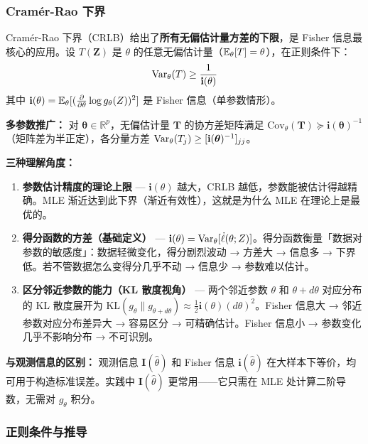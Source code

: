 \subsubsection{Cramér-Rao 下界}

Cramér-Rao 下界（CRLB）给出了\textbf{所有无偏估计量方差的下限}，是 Fisher 信息最核心的应用。设 $T(\mathbf{Z})$ 是 $\theta$ 的任意无偏估计量（$\mathbb{E}_\theta[T] = \theta$），在正则条件下：
\begin{equation}\label{eq:CRLB}
    \mathrm{Var}_\theta(T) \geq \frac{1}{\mathbf{i}(\theta)}
\end{equation}
其中 $\mathbf{i}(\theta) = \mathbb{E}_\theta[(\frac{\partial}{\partial\theta}\log g_\theta(Z))^2]$ 是 Fisher 信息（单参数情形）。

\textbf{多参数推广：} 对 $\bm{\theta} \in \mathbb{R}^p$，无偏估计量 $\mathbf{T}$ 的协方差矩阵满足 $\mathrm{Cov}_\theta(\mathbf{T}) \succeq \mathbf{i}(\bm{\theta})^{-1}$（矩阵差为半正定），各分量方差 $\mathrm{Var}_\theta(T_j) \geq [\mathbf{i}(\bm{\theta})^{-1}]_{jj}$。

\textbf{三种理解角度：}
\begin{enumerate}
    \item \textbf{参数估计精度的理论上限} — $\mathbf{i}(\theta)$ 越大，CRLB 越低，参数能被估计得越精确。MLE 渐近达到此下界（渐近有效性），这就是为什么 MLE 在理论上是最优的。
    \item \textbf{得分函数的方差（基础定义）} — $\mathbf{i}(\theta) = \mathrm{Var}_\theta[\dot{\ell}(\theta; Z)]$。得分函数衡量「数据对参数的敏感度」：数据轻微变化，得分剧烈波动 → 方差大 → 信息多 → 下界低。若不管数据怎么变得分几乎不动 → 信息少 → 参数难以估计。
    \item \textbf{区分邻近参数的能力（KL 散度视角）} — 两个邻近参数 $\theta$ 和 $\theta+d\theta$ 对应分布的 KL 散度展开为 $\mathrm{KL}(g_\theta \parallel g_{\theta+d\theta}) \approx \frac{1}{2}\mathbf{i}(\theta)(d\theta)^2$。Fisher 信息大 → 邻近参数对应分布差异大 → 容易区分 → 可精确估计。Fisher 信息小 → 参数变化几乎不影响分布 → 不可识别。
\end{enumerate}

\textbf{与观测信息的区别：} 观测信息 $\mathbf{I}(\hat{\theta})$ 和 Fisher 信息 $\mathbf{i}(\hat{\theta})$ 在大样本下等价，均可用于构造标准误差。实践中 $\mathbf{I}(\hat{\theta})$ 更常用——它只需在 MLE 处计算二阶导数，无需对 $g_\theta$ 积分。

\subsubsection{正则条件与推导}

